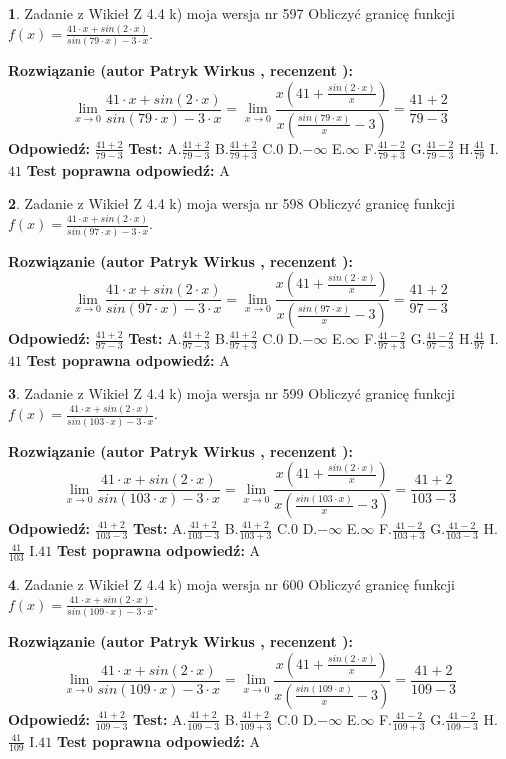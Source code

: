 \documentclass[12pt, a4paper]{article}
\theoremstyle{definition} %
\newtheorem{zad}{}
\newcommand{\zadStart}[1]{\begin{zad}#1\newline}
\newcommand{\zadStop}{\end{zad}}
\newcommand{\rozwStart}[2]{\noindent \textbf{Rozwiązanie (autor #1 , recenzent #2): }\newline}
\newcommand{\rozwStop}{\newline}
\newcommand{\odpStart}{\noindent \textbf{Odpowiedź:}\newline}
\newcommand{\odpStop}{\newline}
\newcommand{\testStart}{\noindent \textbf{Test:}\newline}
\newcommand{\testStop}{\newline}
\newcommand{\kluczStart}{\noindent \textbf{Test poprawna odpowiedź:}\newline}
\newcommand{\kluczStop}{\newline}
\begin{document}
\zadStart{Zadanie z Wikieł Z 4.4 k) moja wersja nr 597}
Obliczyć granicę funkcji $f(x)=\frac{41\cdot x +sin(2\cdot x)}{sin(79\cdot x) -3\cdot x}$.
\zadStop
\rozwStart{Patryk Wirkus}{}
$$\lim\limits_{x\to 0}\frac{41\cdot x +sin(2\cdot x)}{sin(79\cdot x) -3\cdot x}
=\lim\limits_{x\to 0}\frac{x(41+\frac{sin(2\cdot x)}{x})}{x(\frac{sin(79\cdot x)}{x}-3)}
=\frac{41+2}{79-3}$$
\rozwStop
\odpStart
$\frac{41+2}{79-3}$
\odpStop
\testStart
A.$\frac{41+2}{79-3}$
B.$\frac{41+2}{79+3}$
C.$0$
D.$-\infty$
E.$\infty$
F.$\frac{41-2}{79+3}$
G.$\frac{41-2}{79-3}$
H.$\frac{41}{79}$
I.$41$
\testStop
\kluczStart
A
\kluczStop



\zadStart{Zadanie z Wikieł Z 4.4 k) moja wersja nr 598}
Obliczyć granicę funkcji $f(x)=\frac{41\cdot x +sin(2\cdot x)}{sin(97\cdot x) -3\cdot x}$.
\zadStop
\rozwStart{Patryk Wirkus}{}
$$\lim\limits_{x\to 0}\frac{41\cdot x +sin(2\cdot x)}{sin(97\cdot x) -3\cdot x}
=\lim\limits_{x\to 0}\frac{x(41+\frac{sin(2\cdot x)}{x})}{x(\frac{sin(97\cdot x)}{x}-3)}
=\frac{41+2}{97-3}$$
\rozwStop
\odpStart
$\frac{41+2}{97-3}$
\odpStop
\testStart
A.$\frac{41+2}{97-3}$
B.$\frac{41+2}{97+3}$
C.$0$
D.$-\infty$
E.$\infty$
F.$\frac{41-2}{97+3}$
G.$\frac{41-2}{97-3}$
H.$\frac{41}{97}$
I.$41$
\testStop
\kluczStart
A
\kluczStop



\zadStart{Zadanie z Wikieł Z 4.4 k) moja wersja nr 599}
Obliczyć granicę funkcji $f(x)=\frac{41\cdot x +sin(2\cdot x)}{sin(103\cdot x) -3\cdot x}$.
\zadStop
\rozwStart{Patryk Wirkus}{}
$$\lim\limits_{x\to 0}\frac{41\cdot x +sin(2\cdot x)}{sin(103\cdot x) -3\cdot x}
=\lim\limits_{x\to 0}\frac{x(41+\frac{sin(2\cdot x)}{x})}{x(\frac{sin(103\cdot x)}{x}-3)}
=\frac{41+2}{103-3}$$
\rozwStop
\odpStart
$\frac{41+2}{103-3}$
\odpStop
\testStart
A.$\frac{41+2}{103-3}$
B.$\frac{41+2}{103+3}$
C.$0$
D.$-\infty$
E.$\infty$
F.$\frac{41-2}{103+3}$
G.$\frac{41-2}{103-3}$
H.$\frac{41}{103}$
I.$41$
\testStop
\kluczStart
A
\kluczStop



\zadStart{Zadanie z Wikieł Z 4.4 k) moja wersja nr 600}
Obliczyć granicę funkcji $f(x)=\frac{41\cdot x +sin(2\cdot x)}{sin(109\cdot x) -3\cdot x}$.
\zadStop
\rozwStart{Patryk Wirkus}{}
$$\lim\limits_{x\to 0}\frac{41\cdot x +sin(2\cdot x)}{sin(109\cdot x) -3\cdot x}
=\lim\limits_{x\to 0}\frac{x(41+\frac{sin(2\cdot x)}{x})}{x(\frac{sin(109\cdot x)}{x}-3)}
=\frac{41+2}{109-3}$$
\rozwStop
\odpStart
$\frac{41+2}{109-3}$
\odpStop
\testStart
A.$\frac{41+2}{109-3}$
B.$\frac{41+2}{109+3}$
C.$0$
D.$-\infty$
E.$\infty$
F.$\frac{41-2}{109+3}$
G.$\frac{41-2}{109-3}$
H.$\frac{41}{109}$
I.$41$
\testStop
\kluczStart
A
\kluczStop
\end{document}
